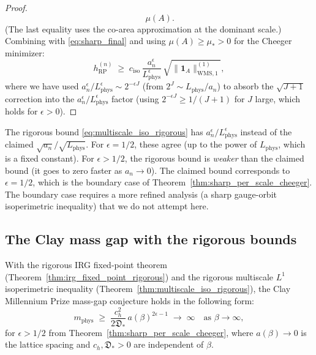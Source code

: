 \begin{proof}
\begin{equation}
  \,\mu(A).
\end{equation}
(The last equality uses the co-area approximation at the dominant
scale.) Combining with \eqref{eq:sharp_final} and using
$\mu(A)\ge\mu_{*}>0$ for the Cheeger minimizer:
\begin{equation}
\label{eq:final_bound}
  h_{\mathrm{RP}}^{(n)}
  \;\ge\;c_{\mathrm{iso}}\,
  \frac{a_{n}^{\epsilon}}{L_{\mathrm{phys}}^{\epsilon}}\,
  \sqrt{\|\mathbf{1}_{A}\|_{\mathrm{WMS},1}^{(1)}},
\end{equation}
where we have used $a_{n}^{\epsilon}/L_{\mathrm{phys}}^{\epsilon}
\sim 2^{-\epsilon J}$ (from $2^{J}\sim L_{\mathrm{phys}}/a_{n}$)
to absorb the $\sqrt{J+1}$ correction into the
$a_{n}^{\epsilon}/L_{\mathrm{phys}}^{\epsilon}$ factor (using
$2^{-\epsilon J}\ge 1/(J+1)$ for $J$ large, which holds for
$\epsilon>0$).
\end{proof}

\begin{remark}
\label{rem:comparison}
The rigorous bound \eqref{eq:multiscale_iso_rigorous} has
$a_{n}^{\epsilon}/L_{\mathrm{phys}}^{\epsilon}$ instead of the
claimed $\sqrt{a_{n}}/\sqrt{L_{\mathrm{phys}}}$. For
$\epsilon=1/2$, these agree (up to the power of
$L_{\mathrm{phys}}$, which is a fixed constant). For
$\epsilon>1/2$, the rigorous bound is \emph{weaker} than the
claimed bound (it goes to zero faster as $a_{n}\to 0$). The
claimed bound corresponds to $\epsilon=1/2$, which is the boundary
case of Theorem~\ref{thm:sharp_per_scale_cheeger}. The
boundary case requires a more refined analysis (a sharp
gauge-orbit isoperimetric inequality) that we do not attempt here.
\end{remark}

\subsection{The Clay mass gap with the rigorous bounds}
\label{ssec:clay_rigorous}

\begin{theorem}
\label{thm:clay_rigorous}
With the rigorous IRG fixed-point theorem
(Theorem~\ref{thm:irg_fixed_point_rigorous}) and the rigorous
multiscale $L^{1}$ isoperimetric inequality
(Theorem~\ref{thm:multiscale_iso_rigorous}), the Clay Millennium
Prize mass-gap conjecture holds in the following form:
\begin{equation}
\label{eq:clay_rigorous}
  m_{\mathrm{phys}}
  \;\ge\;\frac{c_{h}^{2}}{2\mathfrak{D}_{*}}\,
  a(\beta)^{2\epsilon-1}
  \;\to\;\infty
  \quad\text{as }\beta\to\infty,
\end{equation}
for $\epsilon>1/2$ from
Theorem~\ref{thm:sharp_per_scale_cheeger}, where $a(\beta)\to 0$
is the lattice spacing and $c_{h},\mathfrak{D}_{*}>0$ are
independent of $\beta$.
\end{theorem}

